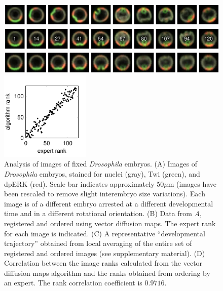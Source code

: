 \documentclass[twocolumn, 10pt]{article}
\newcommand{\SI}[0]{supplementary material}
\begin{document}
\begin{figure}[t!]
\begin{minipage}[b]{12cm}
\includegraphics[width=12.25cm]{drosophila_fixed_images_scrambled}

\includegraphics[width=12.25cm]{drosophila_fixed_images_ordered}

\includegraphics[width=12.25cm]{drosophila_fixed_images_average}
\end{minipage}
%
\hfill
%
\includegraphics[width=4.25cm]{drosophila_fixed_images_rank_corr}
%
\caption{Analysis of images of fixed \textit{Drosophila} embryos. {(A)} Images of \textit{ Drosophila} embryos, stained for nuclei (gray), Twi (green), and dpERK (red). Scale bar indicates approximately 50$\mu$m (images have been rescaled to remove slight interembryo size variations).  Each image is of a different embryo arrested at a different developmental time and in a different rotational orientation. {(B)} Data from {\it A}, registered and ordered using vector diffusion maps. The expert rank for each image is indicated. {(C)} A representative ``developmental trajectory'' obtained from local averaging of the entire set of registered and ordered images (see \SI). {(D)} Correlation between the image ranks calculated from the vector diffusion maps algorithm and the ranks obtained from ordering by an expert. The rank correlation coefficient is $0.9716$. }
\label{fig:drosophila_fixed_images}
\end{figure}
\end{document}
